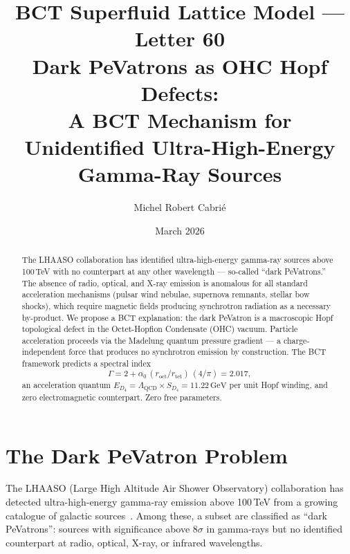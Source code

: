 \documentclass[twocolumn,prl,showpacs,preprintnumbers,amsmath,amssymb]{revtex4-1}
\begin{document}
\title{BCT Superfluid Lattice Model --- Letter 60\\
Dark PeVatrons as OHC Hopf Defects:\\
A BCT Mechanism for Unidentified Ultra-High-Energy\\
Gamma-Ray Sources}

\author{Michel Robert Cabri\'e}
\date{March 2026}

\begin{abstract}
The LHAASO collaboration has identified ultra-high-energy gamma-ray
sources above 100\,TeV with no counterpart at any other wavelength ---
so-called ``dark PeVatrons.'' The absence of radio, optical, and X-ray
emission is anomalous for all standard acceleration mechanisms (pulsar
wind nebulae, supernova remnants, stellar bow shocks), which require
magnetic fields producing synchrotron radiation as a necessary
by-product. We propose a BCT explanation: the dark PeVatron is a
macroscopic Hopf topological defect in the Octet-Hopfion Condensate
(OHC) vacuum. Particle acceleration proceeds via the Madelung quantum
pressure gradient --- a charge-independent force that produces no
synchrotron emission by construction. The BCT framework predicts a
spectral index
\begin{equation*}
\Gamma = 2 + \alpha_0\,(r_\mathrm{oct}/r_\mathrm{tet})\,(4/\pi) = 2.017,
\end{equation*}
an acceleration quantum $E_{D_4} = \Lambda_\mathrm{QCD}\times S_{D_4}
= 11.22\,\mathrm{GeV}$ per unit Hopf winding, and zero electromagnetic
counterpart. Zero free parameters.
\end{abstract}

\maketitle

\section{The Dark PeVatron Problem}

The LHAASO (Large High Altitude Air Shower Observatory) collaboration
has detected ultra-high-energy gamma-ray emission above 100\,TeV from
a growing catalogue of galactic sources~\cite{LHAASO21}. Among these,
a subset are classified as ``dark PeVatrons'': sources with significance
above $8\sigma$ in gamma-rays but no identified counterpart at radio,
optical, X-ray, or infrared wavelengths.
\end{document}
